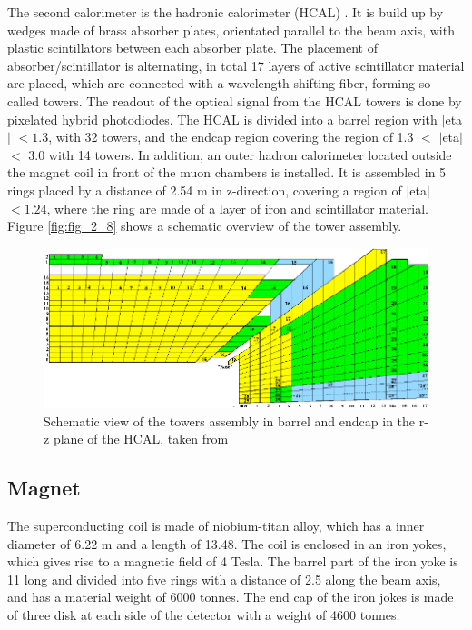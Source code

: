 The second calorimeter is the hadronic calorimeter (\gls{HCAL}) \cite{CMS2, HCAL}. It is build up by wedges made of brass absorber plates, orientated parallel to the beam axis, with plastic scintillators between each absorber plate. The placement of absorber/scintillator is alternating, in total 17 layers of active scintillator material are placed, which are connected with a wavelength shifting fiber, forming so-called towers. The readout of the optical signal from the HCAL towers is done by pixelated hybrid photodiodes. The \gls{HCAL} is divided into a barrel region with $|$\gls{eta}$|$ $< 1.3$, with 32 towers, and the endcap region covering the region of 1.3 $<$ $|$\gls{eta}$|$ $<$ 3.0 with 14 towers. In addition, an outer hadron calorimeter located outside the magnet coil in front of the muon chambers is installed. It is assembled in 5 rings placed by a distance of 2.54 m in z-direction, covering a region of $|$\gls{eta}$|$ $< 1.24$, where the ring are made of a layer of iron and scintillator material. Figure \ref{fig:fig_2_8} shows a schematic overview of the tower assembly. \\

\begin{figure}[ht]
	\centering
	\includegraphics[width=1\textwidth]{pictures/HCAL.pdf}

	\caption[Hadronic calorimeter of CMS]{Schematic view of the towers assembly in barrel and endcap in the r-z plane of the \gls{HCAL}, taken from \cite{CMS2}}
	\label{fig:fig_2_9}
\end{figure}

\subsection*{Magnet}

The superconducting coil is made of niobium-titan alloy, which has a inner diameter of 6.22 m and a length of 13.48. The coil is enclosed in an iron yokes, which gives rise to a magnetic field of 4 Tesla. The barrel part of the iron yoke is 11 long and divided into five rings with a distance of 2.5 along the beam axis, and has a material weight of 6000 tonnes. The end cap of the iron jokes is made of three disk at each side of the detector with a weight of 4600 tonnes.

